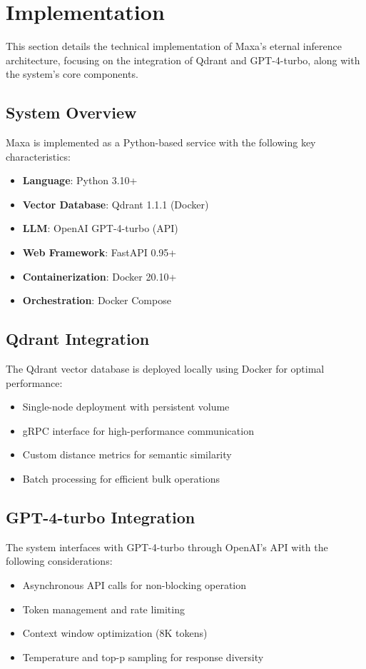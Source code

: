 \section{Implementation}
\label{sec:implementation}

This section details the technical implementation of Maxa's eternal inference architecture, focusing on the integration of Qdrant and GPT-4-turbo, along with the system's core components.

\subsection{System Overview}
Maxa is implemented as a Python-based service with the following key characteristics:
\begin{itemize}
    \item \textbf{Language}: Python 3.10+
    \item \textbf{Vector Database}: Qdrant 1.1.1 (Docker)
    \item \textbf{LLM}: OpenAI GPT-4-turbo (API)
    \item \textbf{Web Framework}: FastAPI 0.95+
    \item \textbf{Containerization}: Docker 20.10+
    \item \textbf{Orchestration}: Docker Compose
\end{itemize}

\subsection{Qdrant Integration}
The Qdrant vector database is deployed locally using Docker for optimal performance:
\begin{itemize}
    \item Single-node deployment with persistent volume
    \item gRPC interface for high-performance communication
    \item Custom distance metrics for semantic similarity
    \item Batch processing for efficient bulk operations
\end{itemize}

\subsection{GPT-4-turbo Integration}
The system interfaces with GPT-4-turbo through OpenAI's API with the following considerations:
\begin{itemize}
    \item Asynchronous API calls for non-blocking operation
    \item Token management and rate limiting
    \item Context window optimization (8K tokens)
    \item Temperature and top-p sampling for response diversity
\end{itemize}

